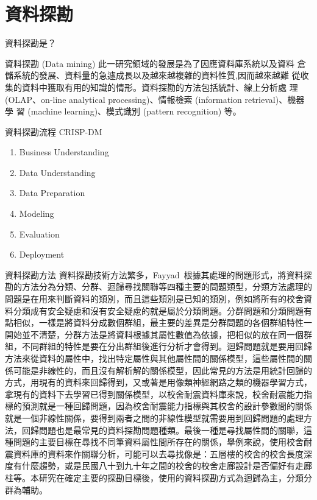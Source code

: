 \renewcommand\thetable{\arabic{chapter}-\arabic{table}}
\renewcommand{\theequation}{\arabic{chapter}-\arabic{equation}}
\chapter{資料探勘}

資料探勘是？


資料探勘 (Data mining) 此一研究領域的發展是為了因應資料庫系統以及資料 倉儲系統的發展、資料量的急遽成長以及越來越複雜的資料性質,因而越來越難 從收集的資料中獲取有用的知識的情形。資料探勘的方法包括統計、線上分析處 理 (OLAP、on-line analytical processing)、情報檢索 (information retrieval)、機器學 習 (machine learning)、模式識別 (pattern recognition) 等。

資料探勘流程
CRISP-DM~\cite{shearer2000crisp}


\begin{enumerate}
\item Business Understanding
\item Data Understanding
\item Data Preparation
\item Modeling
\item Evaluation
\item Deployment
\end{enumerate}


資料探勘方法
資料探勘技術方法繁多，Fayyad~\cite{fayyad1996data}根據其處理的問題形式，將資料探勘的方法分為分類、分群、迴歸尋找關聯等四種主要的問題類型，分類方法處理的問題是在用來判斷資料的類別，而且這些類別是已知的類別，例如將所有的校舍資料分類成有安全疑慮和沒有安全疑慮的就是屬於分類問題。分群問題和分類問題有點相似，一樣是將資料分成數個群組，最主要的差異是分群問題的各個群組特性一開始並不清楚，分群方法是將資料根據其屬性數值為依據，把相似的放在同一個群組，不同群組的特性是要在分出群組後進行分析才會得到。迴歸問題就是要用回歸方法來從資料的屬性中，找出特定屬性與其他屬性間的關係模型，這些屬性間的關係可能是非線性的，而且沒有解析解的關係模型，因此常見的方法是用統計回歸的方式，用現有的資料來回歸得到，又或著是用像類神經網路之類的機器學習方式，拿現有的資料下去學習已得到關係模型，以校舍耐震資料庫來說，校舍耐震能力指標的預測就是一種回歸問題，因為校舍耐震能力指標與其校舍的設計參數間的關係就是一個非線性關係，要得到兩者之間的非線性模型就需要用到回歸問題的處理方法，回歸問題也是最常見的資料探勘問題種類。最後一種是尋找屬性間的關聯，這種問題的主要目標在尋找不同筆資料屬性間所存在的關係，舉例來說，使用校舍耐震資料庫的資料來作關聯分析，可能可以去尋找像是：五層樓的校舍的校舍長度深度有什麼趨勢，或是民國八十到九十年之間的校舍的校舍走廊設計是否偏好有走廊柱等。本研究在確定主要的探勘目標後，使用的資料探勘方式為迴歸為主，分類分群為輔助。



